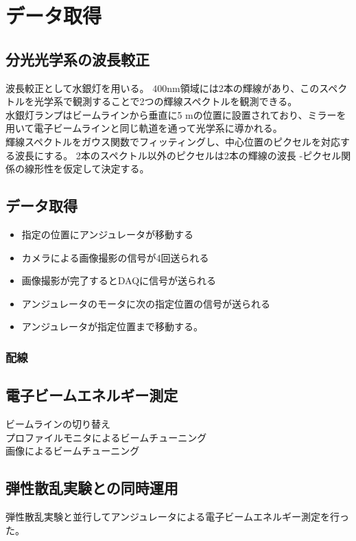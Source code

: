 \documentclass[a4paper,11pt,uplatex]{jsbook}
\begin{document}
\section{データ取得}

\subsection{分光光学系の波長較正}
波長較正として水銀灯を用いる。
$400 \text{nm}$領域には2本の輝線があり、このスペクトルを光学系で観測することで2つの輝線スペクトルを観測できる。\\
水銀灯ランプはビームラインから垂直に5 mの位置に設置されており、ミラーを用いて電子ビームラインと同じ軌道を通って光学系に導かれる。\\

輝線スペクトルをガウス関数でフィッティングし、中心位置のピクセルを対応する波長にする。
2本のスペクトル以外のピクセルは2本の輝線の波長 -ピクセル関係の線形性を仮定して決定する。
\subsection{データ取得}
\begin{itemize}
  \item 指定の位置にアンジュレータが移動する
  \item カメラによる画像撮影の信号が4回送られる
  \item 画像撮影が完了するとDAQに信号が送られる
  \item アンジュレータのモータに次の指定位置の信号が送られる
  \item アンジュレータが指定位置まで移動する。
\end{itemize}
\subsubsection{配線}

\subsection{電子ビームエネルギー測定}

ビームラインの切り替え\\
プロファイルモニタによるビームチューニング\\
画像によるビームチューニング\\

\subsection{弾性散乱実験との同時運用}
弾性散乱実験と並行してアンジュレータによる電子ビームエネルギー測定を行った。
\end{document}
